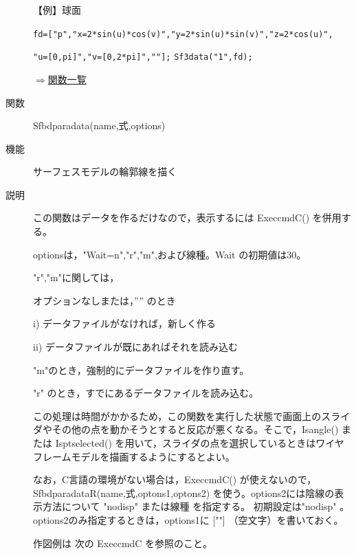 \documentclass[papersize,a4paper,12pt,uplatex]{jsarticle}
\begin{document}
\begin{description}
 \vspace{\baselineskip}
 【例】球面
 
 \verb|fd=["p","x=2*sin(u)*cos(v)","y=2*sin(u)*sin(v)","z=2*cos(u)",|

\verb|"u=[0,pi]","v=[0,2*pi]",""];|
\verb|Sf3data("1",fd);|

\begin{center}  \end{center}

\begin{flushright} \hyperlink{functionlist}{$\Rightarrow$関数一覧}\end{flushright}

\hypertarget{sfbdparadata}{}
\item[関数]Sfbdparadata(name,式,options)
\item[機能]サーフェスモデルの輪郭線を描く
\item[説明]この関数はデータを作るだけなので，表示するには ExeccmdC() を併用する。

optionsは，"Wait=n","r","m",および線種。Wait の初期値は30。

 "r","m"に関しては，
 
\hspace{5mm} オプションなしまたは，”” のとき
 
\hspace{10mm}i) データファイルがなければ，新しく作る

\hspace{10mm}ii) データファイルが既にあればそれを読み込む

\hspace{5mm}"m"のとき，強制的にデータファイルを作り直す。

\hspace{5mm}"r" のとき，すでにあるデータファイルを読み込む。

この処理は時間がかかるため，この関数を実行した状態で画面上のスライダやその他の点を動かそうとすると反応が悪くなる。そこで，Isangle() または Isptselected() を用いて，スライダの点を選択しているときはワイヤフレームモデルを描画するようにするとよい。

なお，C言語の環境がない場合は，ExeccmdC() が使えないので，SfbdparadataR(name,式,optons1,optons2) を使う。options2には陰線の表示方法について "nodisp" または線種 を指定する。 初期設定は"nodisp" 。options2のみ指定するときは，options1に [""] （空文字）を書いておく。

作図例は 次の ExeccmdC を参照のこと。


\end{description}
\end{document}
